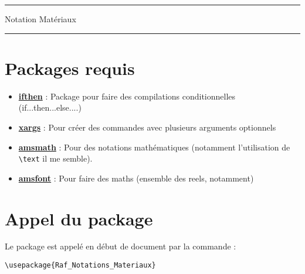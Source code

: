\documentclass[a4paper,12pt]{article}
\begin{document}
	\begin{center}
		\hrule{\Large Notation Matériaux}\\\hrule
	\end{center}

	\section{Packages requis}
		\begin{itemize}
			\item \href{http://www.ctan.org/pkg/ifthen}{\textbf{ifthen}} : Package pour faire des compilations conditionnelles (if...then...else....)
			\item \href{http://www.ctan.org/pkg/xargs}{\textbf{xargs}} : Pour créer des commandes avec plusieurs arguments optionnels
			\item \href{http://www.ctan.org/pkg/amsmath}{\textbf{amsmath}} : Pour des notations mathématiques (notamment l'utilisation de \verb!\text! il me semble).
			\item \href{http://www.ams.org/publications/authors/tex/amsfonts}{\textbf{amsfont}} : Pour faire des maths (ensemble des reels, notamment)
		\end{itemize}

	\section{Appel du package}

		Le package est appelé en début de document par la commande :
		\begin{verbatim}
\usepackage{Raf_Notations_Materiaux}
		\end{verbatim}

% 
\end{document}
